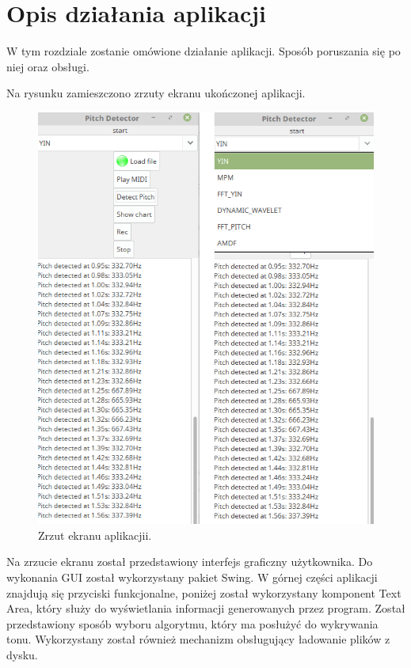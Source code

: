 \section{{Opis działania aplikacji}}

W tym rozdziale zostanie omówione działanie aplikacji. Sposób poruszania się po niej oraz obsługi.


Na rysunku zamieszczono zrzuty ekranu ukończonej aplikacji.

\begin{figure}[h!]
  \centering
  \includegraphics[width=0.5\linewidth]{rys/zrzut1}
  \caption{Zrzut ekranu aplikacjii.}
  \label{fig:schemat}
\end{figure}


Na zrzucie ekranu został przedstawiony interfejs graficzny użytkownika. Do wykonania GUI został wykorzystany pakiet Swing. W górnej części aplikacji znajdują się przyciski funkcjonalne, poniżej został wykorzystany komponent Text Area, który służy do wyświetlania informacji generowanych przez program. Został przedstawiony sposób wyboru algorytmu, który ma posłużyć do wykrywania tonu. Wykorzystany został również mechanizm obsługujący ładowanie plików z dysku.